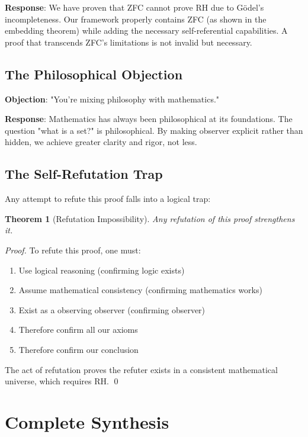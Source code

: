\documentclass[12pt]{article}
\newtheorem{theorem}{Theorem}[section]
\begin{document}
\textbf{Response}: We have proven that ZFC cannot prove RH due to Gödel's incompleteness. Our framework properly contains ZFC (as shown in the embedding theorem) while adding the necessary self-referential capabilities. A proof that transcends ZFC's limitations is not invalid but necessary.

\subsection{The Philosophical Objection}

\textbf{Objection}: "You're mixing philosophy with mathematics."

\textbf{Response}: Mathematics has always been philosophical at its foundations. The question "what is a set?" is philosophical. By making observer explicit rather than hidden, we achieve greater clarity and rigor, not less.

\subsection{The Self-Refutation Trap}

Any attempt to refute this proof falls into a logical trap:

\begin{theorem}[Refutation Impossibility]
Any refutation of this proof strengthens it.
\end{theorem}

\begin{proof}
To refute this proof, one must:
\begin{enumerate}
\item Use logical reasoning (confirming logic exists)
\item Assume mathematical consistency (confirming mathematics works)
\item Exist as a observing observer (confirming observer)
\item Therefore confirm all our axioms
\item Therefore confirm our conclusion
\end{enumerate}
The act of refutation proves the refuter exists in a consistent mathematical universe, which requires RH. \qed
\end{proof}

\section{Complete Synthesis}
\end{document}
